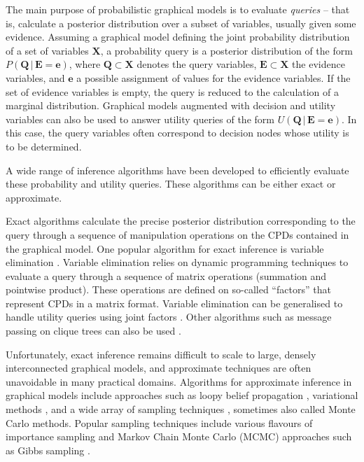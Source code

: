 The main purpose of probabilistic graphical models is to evaluate \textit{queries} -- that is, calculate a posterior distribution over a subset of variables, usually given some evidence. Assuming a graphical model defining the joint probability distribution of a set of variables $\mathbf{X}$, a probability query is a posterior distribution of the form $P(\mathbf{Q}  \, | \,  \mathbf{E}\!=\!\mathbf{e})$, where $\mathbf{Q} \subset \mathbf{X}$ denotes the query variables, $\mathbf{E} \subset \mathbf{X}$ the evidence variables, and $\mathbf{e}$ a possible assignment of values for the evidence variables.  If the set of evidence variables is empty, the query is reduced to the calculation of a marginal distribution.  Graphical models augmented with decision and utility variables can also be used to answer utility queries of the form $U(\mathbf{Q}   \, | \,  \mathbf{E}\!=\!\mathbf{e})$.  In this case, the query variables often correspond to decision nodes whose utility is to be determined.

A wide range of inference algorithms have been developed to efficiently evaluate these probability and utility queries. These algorithms can be either exact or approximate.  

Exact algorithms calculate the precise posterior distribution corresponding to the query through a sequence of manipulation operations on the CPDs contained in the graphical model.  One popular algorithm for exact inference is variable elimination \citep{ZhangP96}.  Variable elimination relies on dynamic programming techniques to evaluate a query through a sequence of matrix operations (summation and pointwise product). These operations are defined on so-called ``factors'' that represent CPDs in a matrix format. Variable elimination can be generalised to handle utility queries using joint factors \citep{Koller+Friedman:09}.   Other algorithms such as message passing on clique trees can also be used \citep{jensen1990}. 

Unfortunately, exact inference remains difficult to scale to large, densely interconnected graphical models, and  approximate techniques are often unavoidable in many practical domains.  Algorithms for approximate inference in graphical models include approaches such as loopy belief propagation \citep{Murphy:1999}, variational methods \citep{Jordan:1999},  and a wide array of sampling techniques \citep{mackay1998introduction}, sometimes also called Monte Carlo methods. Popular sampling techniques include various flavours of importance sampling \citep{FungC89,cheng2000ais} and Markov Chain Monte Carlo (MCMC) approaches such as Gibbs sampling \citep{pearl1987evidential,gamerman2006markov}. %

